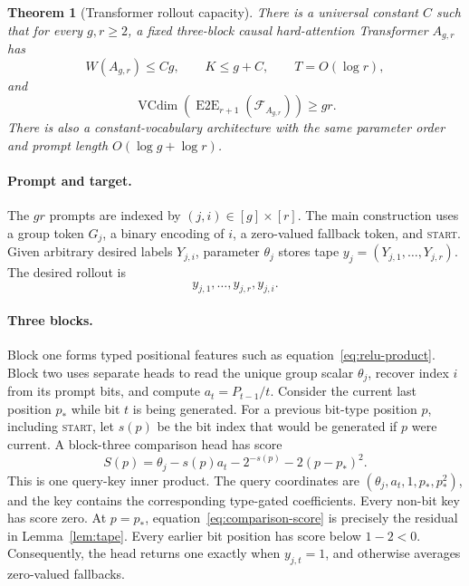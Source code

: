 \documentclass{article}
\newtheorem{theorem}{Theorem}
\newcommand{\1}{\mathbf 1}
\newcommand{\VC}{\operatorname{VCdim}}
\newcommand{\EtoE}{\operatorname{E2E}}
\begin{document}
\begin{theorem}[Transformer rollout capacity]\label{thm:lower}
There is a universal constant $C$ such that for every $g,r\geq2$, a fixed three-block causal
hard-attention Transformer $A_{g,r}$ has
\[
 W(A_{g,r})\leq Cg,\qquad K\leq g+C,\qquad T=O(\log r),
\]
and
\begin{equation}
 \VC(\EtoE_{r+1}(\mathcal F_{A_{g,r}}))\geq gr.
 \label{eq:main-lower}
\end{equation}
There is also a constant-vocabulary architecture with the same parameter order and prompt length
$O(\log g+\log r)$.
\end{theorem}

\paragraph{Prompt and target.}
The $gr$ prompts are indexed by $(j,i)\in[g]\times[r]$. The main construction uses a group
token $G_j$, a binary encoding of $i$, a zero-valued fallback token, and \textsc{start}. Given
arbitrary desired labels $Y_{j,i}$, parameter $\theta_j$ stores tape
$y_j=(Y_{j,1},\ldots,Y_{j,r})$. The desired rollout is
\begin{equation}
 y_{j,1},\ldots,y_{j,r},y_{j,i}.
 \label{eq:desired-rollout}
\end{equation}

\paragraph{Three blocks.}
Block one forms typed positional features such as equation~\eqref{eq:relu-product}. Block two
uses separate heads to read the unique group scalar $\theta_j$, recover index $i$ from its prompt
bits, and compute $a_t=P_{t-1}/t$. Consider the current last position $p_*$ while bit $t$ is being
generated. For a previous bit-type position $p$, including \textsc{start}, let $s(p)$ be the bit
index that would be generated if $p$ were current. A block-three comparison head has score
\begin{equation}
 S(p)=\theta_j-s(p)a_t-2^{-s(p)}-2(p-p_*)^2.
 \label{eq:comparison-score}
\end{equation}
This is one query-key inner product. The query coordinates are
$(\theta_j,a_t,1,p_*,p_*^2)$, and the key contains the corresponding type-gated coefficients.
Every non-bit key has score zero. At $p=p_*$, equation~\eqref{eq:comparison-score} is precisely
the residual in Lemma~\ref{lem:tape}. Every earlier bit position has score below $1-2<0$.
Consequently, the head returns one exactly when $y_{j,t}=1$, and otherwise averages zero-valued
fallbacks.
\end{document}
